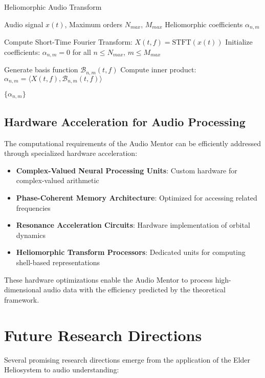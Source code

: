 \begin{algorithm}
\caption{Heliomorphic Audio Transform}
\begin{algorithmic}[1]
\Require Audio signal $x(t)$, Maximum orders $N_{max}$, $M_{max}$
\Ensure Heliomorphic coefficients $\alpha_{n,m}$

\State Compute Short-Time Fourier Transform: $X(t, f) = \text{STFT}(x(t))$
\State Initialize coefficients: $\alpha_{n,m} = 0$ for all $n \leq N_{max}$, $m \leq M_{max}$

        \State Generate basis function $\mathcal{B}_{n,m}(t, f)$
        \State Compute inner product: $\alpha_{n,m} = \langle X(t,f), \mathcal{B}_{n,m}(t,f) \rangle$
    \EndFor
\EndFor

\State \Return $\{\alpha_{n,m}\}$
\end{algorithmic}
\end{algorithm}

\subsection{Hardware Acceleration for Audio Processing}

The computational requirements of the Audio Mentor can be efficiently addressed through specialized hardware acceleration:

\begin{itemize}
    \item \textbf{Complex-Valued Neural Processing Units}: Custom hardware for complex-valued arithmetic
    \item \textbf{Phase-Coherent Memory Architecture}: Optimized for accessing related frequencies
    \item \textbf{Resonance Acceleration Circuits}: Hardware implementation of orbital dynamics
    \item \textbf{Heliomorphic Transform Processors}: Dedicated units for computing shell-based representations
\end{itemize}

These hardware optimizations enable the Audio Mentor to process high-dimensional audio data with the efficiency predicted by the theoretical framework.

\section{Future Research Directions}

Several promising research directions emerge from the application of the Elder Heliosystem to audio understanding:

